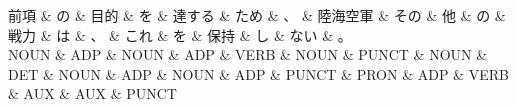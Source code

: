 \documentclass[tikz,border=5pt]{standalone}
\begin{document}
\normalsize
\begin{dependency}[edge unit distance=12.0pt]
    \begin{deptext}[column sep=1em]
        前項 \& の \& 目的 \& を \& 達する \& ため \& 、 \& 陸海空軍 \& その \& 他 \& の \& 戦力 \& は \& 、 \& これ \& を \& 保持 \& し \& ない \& 。\\
        NOUN \& ADP \& NOUN \& ADP \& VERB \& NOUN \& PUNCT \& NOUN \& DET \& NOUN \& ADP \& NOUN \& ADP \& PUNCT \& PRON \& ADP \& VERB \& AUX \& AUX \& PUNCT\\
    \end{deptext}
\end{dependency}
\end{document}
